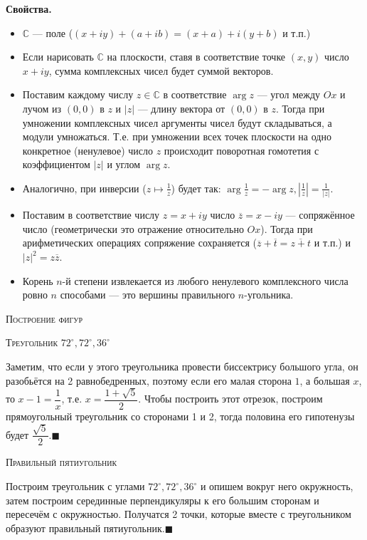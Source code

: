 \documentclass[a4paper,12pt]{article}
\newcommand*{\QEDA}{\hfill\ensuremath{\blacksquare}}
\newcounter{problems}
\newcommand{\zs}[1]{\refstepcounter{problems}{\bf Упражнение \arabic{problems} (#1 балла).}}
\begin{document}
{\bf Свойства.} \begin{itemize}
	\item $\mathbb C$ --- поле ($(x+iy)+(a+ib)=(x+a)+i(y+b)$ и т.п.)
	\item Если нарисовать $\mathbb C$ на плоскости, ставя в соответствие точке $(x,y)$ число $x+iy$, сумма комплексных чисел будет суммой векторов.
	\item Поставим каждому числу $z\in\mathbb C$ в соответствие $\arg z$ --- угол между $Ox$ и лучом из $(0,0)$ в $z$ и $|z|$ --- длину вектора от $(0,0)$ в $z$. Тогда при умножении комплексных чисел аргументы чисел будут складываться, а модули умножаться. Т.е. при умножении всех точек плоскости на одно конкретное (ненулевое) число $z$ происходит поворотная гомотетия с коэффициентом $|z|$ и углом $\arg z$.
	\item Аналогично, при инверсии ($z\mapsto\frac1z$) будет так: $\arg\frac1z=-\arg z,|\frac1z|=\frac1{|z|}$.
	\item Поставим в соответствие числу $z=x+iy$ число $\overline z=x-iy$ --- сопряжённое число (геометрически это отражение относительно $Ox$). Тогда при арифметических операциях сопряжение сохраняется ($\overline z+\overline t=\overline{z+t}$ и т.п.) и $|z|^2=z\overline z$.
	\item Корень $n$-й степени извлекается из любого ненулевого комплексного числа ровно $n$ способами --- это вершины правильного $n$-угольника.
\end{itemize}


\newpage
\centerline{\large\scshape Построение фигур}
\centerline{\scshape Треугольник $72^\circ,72^\circ,36^\circ$}
Заметим, что если у этого треугольника провести биссектрису большого угла, он разобьётся на 2 равнобедренных, поэтому если его малая сторона $1$, а большая $x$, то $x-1=\dfrac1x$, т.е. $x=\dfrac{1+\sqrt5}2$. Чтобы построить этот отрезок, построим прямоугольный треугольник со сторонами 1 и 2, тогда половина его гипотенузы будет $\dfrac{\sqrt5}2$.\QEDA\\

\centerline{\scshape Правильный пятиугольник}
Построим треугольник с углами $72^\circ,72^\circ,36^\circ$ и опишем вокруг него окружность, затем построим серединные перпендикуляры к его большим сторонам и пересечём с окружностью. Получатся 2 точки, которые вместе с треугольником образуют правильный пятиугольник.\QEDA\\
\end{document}
